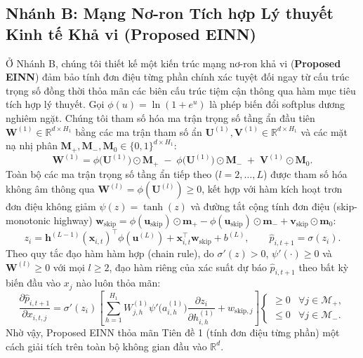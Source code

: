 \documentclass[11pt,a4paper]{article}
\begin{document}
\subsection{Nhánh B: Mạng Nơ-ron Tích hợp Lý thuyết Kinh tế Khả vi (Proposed EINN)}
Ở Nhánh B, chúng tôi thiết kế một kiến trúc mạng nơ-ron khả vi (\textbf{Proposed EINN}) đảm bảo tính đơn điệu từng phần chính xác tuyệt đối ngay từ cấu trúc trọng số đồng thời thỏa mãn các biên cấu trúc tiệm cận thông qua hàm mục tiêu tích hợp lý thuyết. Gọi $\phi(u) = \ln(1 + e^u)$ là phép biến đổi softplus dương nghiêm ngặt. Chúng tôi tham số hóa ma trận trọng số tầng ẩn đầu tiên $\mathbf{W}^{(1)} \in \mathbb{R}^{d \times H_1}$ bằng các ma trận tham số ẩn $\mathbf{U}^{(1)}, \mathbf{V}^{(1)} \in \mathbb{R}^{d \times H_1}$ và các mặt nạ nhị phân $\mathbf{M}_+, \mathbf{M}_-, \mathbf{M}_0 \in \{0,1\}^{d \times H_1}$:
\begin{equation}
    \mathbf{W}^{(1)} = \phi\big(\mathbf{U}^{(1)}\big) \odot \mathbf{M}_+ \;-\; \phi\big(\mathbf{U}^{(1)}\big) \odot \mathbf{M}_- \;+\; \mathbf{V}^{(1)} \odot \mathbf{M}_0.
    \label{eq:einn_w1}
\end{equation}
Toàn bộ các ma trận trọng số tầng ẩn tiếp theo ($l = 2,\dots,L$) được tham số hóa không âm thông qua $\mathbf{W}^{(l)} = \phi(\mathbf{U}^{(l)}) \ge 0$, kết hợp với hàm kích hoạt trơn đơn điệu không giảm $\psi(z) = \tanh(z)$ và đường tắt cộng tính đơn điệu (skip-monotonic highway) $\mathbf{w}_{\text{skip}} = \phi(\mathbf{u}_{\text{skip}}) \odot \mathbf{m}_+ - \phi(\mathbf{u}_{\text{skip}}) \odot \mathbf{m}_- + \mathbf{v}_{\text{skip}} \odot \mathbf{m}_0$:
\begin{equation}
    z_i = \mathbf{h}^{(L-1)}(\mathbf{x}_{i,t})^\top \phi(\mathbf{u}^{(L)}) + \mathbf{x}_{i,t}^\top \mathbf{w}_{\text{skip}} + b^{(L)}, \qquad \hat{p}_{i,t+1} = \sigma(z_i).
\end{equation}
Theo quy tắc đạo hàm hàm hợp (chain rule), do $\sigma'(z) > 0$, $\psi'(\cdot) \ge 0$ và $\mathbf{W}^{(l)} \ge 0$ với mọi $l \ge 2$, đạo hàm riêng của xác suất dự báo $\hat{p}_{i,t+1}$ theo bất kỳ biến đầu vào $x_j$ nào luôn thỏa mãn:
\begin{equation}
    \frac{\partial \hat{p}_{i,t+1}}{\partial x_{i,t,j}} = \sigma'(z_i)\left[ \sum_{h=1}^{H_1} W_{j,h}^{(1)} \psi'\big(a_{i,h}^{(1)}\big) \frac{\partial z_i}{\partial h_{i,h}^{(1)}} + w_{\text{skip},j} \right] \begin{cases}
        \ge 0 & \forall j \in \mathcal{M}_+, \\
        \le 0 & \forall j \in \mathcal{M}_-.
    \end{cases}
\end{equation}
Nhờ vậy, Proposed EINN thỏa mãn Tiên đề 1 (tính đơn điệu từng phần) một cách giải tích trên toàn bộ không gian đầu vào $\mathbb{R}^d$.
\end{document}
